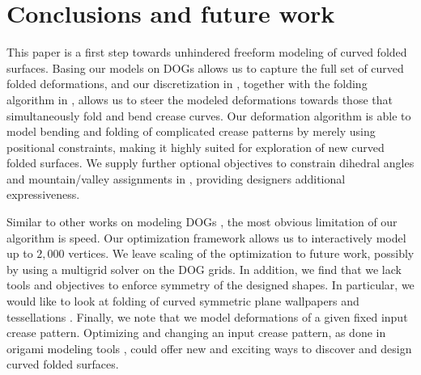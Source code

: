 \section{Conclusions and future work}
This paper is a first step towards unhindered freeform modeling of curved folded surfaces. Basing our models on DOGs \cite{rabi18} allows us to capture the full set of curved folded deformations, and our discretization in , together with the folding algorithm in , allows us to steer the modeled deformations towards those that simultaneously fold and bend crease curves. Our deformation algorithm is able to model bending and folding of complicated crease patterns by merely using positional constraints, making it highly suited for exploration of new curved folded surfaces. We supply further optional objectives to constrain dihedral angles and mountain/valley assignments in , providing designers additional expressiveness. 

Similar to other works on modeling DOGs , the most obvious limitation of our algorithm is speed. Our optimization framework allows us to interactively model up to $2,000$ vertices. We leave scaling of the optimization to future work, possibly by using a multigrid solver on the DOG grids. In addition, we find that we lack tools and objectives to enforce symmetry of the designed shapes. In particular, we would like to look at folding of curved symmetric plane wallpapers and tessellations \cite{demaine_lens,mundilova2019mathematical}.  Finally, we note that we model deformations of a given fixed input crease pattern. Optimizing and changing an input crease pattern, as done in origami modeling tools \cite{tachi2010freeform}, could offer new and exciting ways to discover and design curved folded surfaces. 